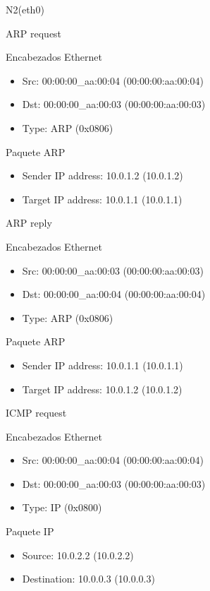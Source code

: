 \documentclass[a4paper,11pt]{article} %
\begin{document}
\setlength{\leftskip}{0.5cm}N2(eth0)\par
\setlength{\leftskip}{1cm}ARP request\par
\indent\indent Encabezados Ethernet
\begin{itemize}
    \setlength{\itemindent}{80px}
    \item Src: 00:00:00\_aa:00:04 (00:00:00:aa:00:04)
    \item Dst: 00:00:00\_aa:00:03 (00:00:00:aa:00:03)
    \item Type: ARP (0x0806)
\end{itemize}

\indent\indent Paquete ARP
\begin{itemize}
    \setlength{\itemindent}{80px}
    \item Sender IP address: 10.0.1.2 (10.0.1.2)
    \item Target IP address: 10.0.1.1 (10.0.1.1)
\end{itemize}

\setlength{\leftskip}{1cm}ARP reply\par
\indent\indent Encabezados Ethernet
\begin{itemize}
    \setlength{\itemindent}{80px}
    \item Src: 00:00:00\_aa:00:03 (00:00:00:aa:00:03)
    \item Dst: 00:00:00\_aa:00:04 (00:00:00:aa:00:04)
    \item Type: ARP (0x0806)
\end{itemize}

\indent\indent Paquete ARP
\begin{itemize}
    \setlength{\itemindent}{80px}
    \item Sender IP address: 10.0.1.1 (10.0.1.1)
    \item Target IP address: 10.0.1.2 (10.0.1.2)
\end{itemize}

\setlength{\leftskip}{1cm}ICMP request

\indent\indent Encabezados Ethernet
\begin{itemize}
    \setlength{\itemindent}{80px}
    \item Src: 00:00:00\_aa:00:04 (00:00:00:aa:00:04)
    \item Dst: 00:00:00\_aa:00:03 (00:00:00:aa:00:03)
    \item Type: IP (0x0800)
\end{itemize}

\indent\indent Paquete IP
\begin{itemize}
    \setlength{\itemindent}{80px}
    \item Source: 10.0.2.2 (10.0.2.2)
    \item Destination: 10.0.0.3 (10.0.0.3)
\end{itemize}
\end{document}
